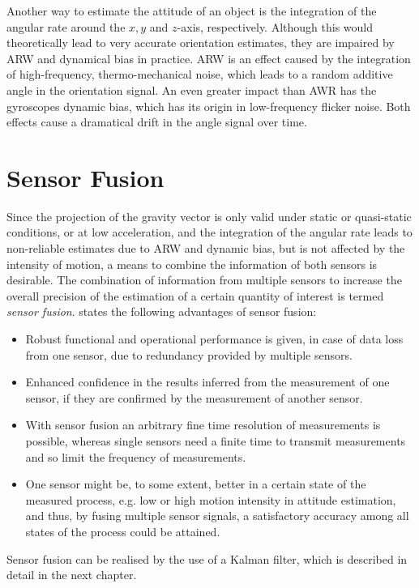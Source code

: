 Another way to estimate the attitude of an object is the integration of the angular rate around the $x, y$ and $z$-axis, respectively. Although this would theoretically lead to very accurate orientation estimates, they are impaired by \gls{ARW} and dynamical bias in practice. \gls{ARW} is an effect caused by the integration of high-frequency, thermo-mechanical noise, which leads to a random additive angle in the orientation signal. An even greater impact than AWR has the gyroscopes dynamic bias, which has its origin in low-frequency flicker noise. Both effects cause a dramatical drift in the angle signal over time.

\section{Sensor Fusion}

Since the projection of the gravity vector is only valid under static or quasi-static conditions, or at low acceleration, and the integration of the angular rate leads to non-reliable estimates due to \gls{ARW} and dynamic bias, but is not affected by the intensity of motion, a means to combine the information of both sensors is desirable. The combination of information from multiple sensors to increase the overall precision of the estimation of a certain quantity of interest is termed \emph{sensor fusion}. \citeauthor{raol2009multi} \cite{raol2009multi} states the following advantages of sensor fusion:
 
\begin{itemize}
\item Robust functional and operational performance is given, in case of data loss from one sensor, due to redundancy provided by multiple sensors.
\item Enhanced confidence in the results inferred from the measurement of one sensor, if they are confirmed by the measurement of another sensor.
\item With sensor fusion an arbitrary fine time resolution of measurements is possible, whereas single sensors need a finite time to transmit measurements and so limit the frequency of measurements.
\item One sensor might be, to some extent, better in a certain state of the measured process, e.g. low or high motion intensity in attitude estimation, and thus, by fusing multiple sensor signals, a satisfactory accuracy among all states of the process could be attained.
\end{itemize}

\noindent
Sensor fusion can be realised by the use of a Kalman filter, which is described in detail in the next chapter.


